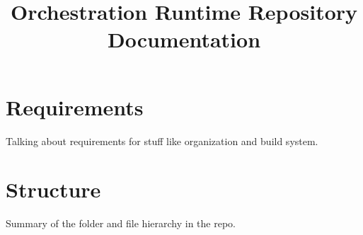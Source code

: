 \documentclass{article}
\title{Orchestration Runtime Repository Documentation}
\begin{document}
\theoremstyle{definition} %
\newtheorem{req}{Req}[section]
\newtheorem{spec}{Spec}[section]

\maketitle
\section{Requirements}
Talking about requirements for stuff like organization and build system.

\section{Structure}
Summary of the folder and file hierarchy in the repo.
\end{document}
